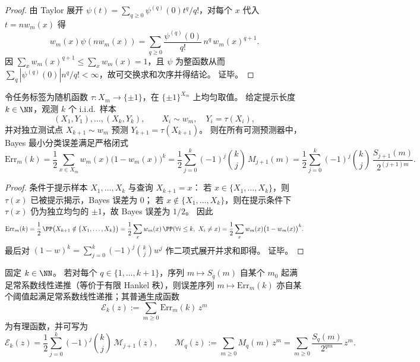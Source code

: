 \begin{proof}
由 Taylor 展开 \(\psi(t)=\sum_{q\ge 0}\psi^{(q)}(0)t^q/q!\)，对每个 \(x\) 代入 \(t=nw_m(x)\) 得
\[
w_m(x)\psi(nw_m(x))=\sum_{q\ge 0}\frac{\psi^{(q)}(0)}{q!}\,n^q\,w_m(x)^{q+1}.
\]
因 \(\sum_x w_m(x)^{q+1}\le \sum_x w_m(x)=1\)，且 \(\psi\) 为整函数从而 \(\sum_q|\psi^{(q)}(0)|n^q/q!<\infty\)，故可交换求和次序并得结论。
证毕。
\end{proof}

\begin{theorem}\label{thm:pom-random-fiber-task-bayes-error}
令任务标签为随机函数 \(\tau:X_m\to\{\pm1\}\)，在 \(\{\pm1\}^{X_m}\) 上均匀取值。
给定提示长度 \(k\in\NN\)，观测 \(k\) 个 i.i.d.\ 样本
\[
(X_1,Y_1),\dots,(X_k,Y_k),
\qquad
X_i\sim w_m,\quad Y_i=\tau(X_i),
\]
并对独立测试点 \(X_{k+1}\sim w_m\) 预测 \(Y_{k+1}=\tau(X_{k+1})\)。
则在所有可测预测器中，Bayes 最小分类误差满足严格闭式
\[
\mathrm{Err}_m(k)
=\frac12\sum_{x\in X_m}w_m(x)\bigl(1-w_m(x)\bigr)^k
=\frac12\sum_{j=0}^{k}(-1)^j\binom{k}{j}\,M_{j+1}(m)
=\frac12\sum_{j=0}^{k}(-1)^j\binom{k}{j}\,\frac{S_{j+1}(m)}{2^{(j+1)m}}.
\]
\end{theorem}

\begin{proof}
条件于提示样本 \(X_1,\dots,X_k\) 与查询 \(X_{k+1}=x\)：
若 \(x\in\{X_1,\dots,X_k\}\)，则 \(\tau(x)\) 已被提示揭示，Bayes 误差为 \(0\)；
若 \(x\notin\{X_1,\dots,X_k\}\)，则在提示条件下 \(\tau(x)\) 仍为独立均匀的 \(\pm1\)，故 Bayes 误差为 \(1/2\)。
因此
\[
\mathrm{Err}_m(k)=\frac12\,\PP\bigl(X_{k+1}\notin\{X_1,\dots,X_k\}\bigr)
=\frac12\sum_x w_m(x)\,\PP(\forall i\le k,\ X_i\neq x)
=\frac12\sum_x w_m(x)\bigl(1-w_m(x)\bigr)^k.
\]
最后对 \((1-w)^k=\sum_{j=0}^k(-1)^j\binom{k}{j}w^j\) 作二项式展开并求和即得。
证毕。
\end{proof}



\begin{corollary}[固定提示长度下的有理生成函数与常系数递推]\label{cor:pom-icl-error-rational-recursion}
固定 \(k\in\NN\)。
若对每个 \(q\in\{1,\dots,k+1\}\)，序列 \(m\mapsto S_q(m)\) 自某个 \(m_0\) 起满足常系数线性递推（等价于有限 Hankel 秩），则误差序列 \(m\mapsto \mathrm{Err}_m(k)\) 亦自某个阈值起满足常系数线性递推；其普通生成函数
\[
\mathcal E_k(z):=\sum_{m\ge 0}\mathrm{Err}_m(k)\,z^m
\]
为有理函数，并可写为
\[
\mathcal E_k(z)=\frac12\sum_{j=0}^{k}(-1)^j\binom{k}{j}\,\mathcal M_{j+1}(z),
\qquad
\mathcal M_q(z):=\sum_{m\ge 0}M_q(m)\,z^m=\sum_{m\ge 0}\frac{S_q(m)}{2^{qm}}\,z^m.
\]
\end{corollary}

